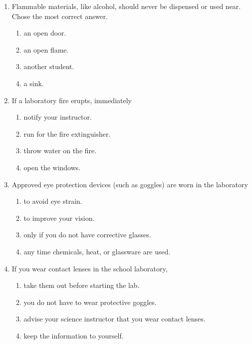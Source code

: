 \documentclass[cover.tex]{subfiles}
\begin{document}
 \begin{refsection}

\begin{multicols*}{2}
\begin{enumerate}

\item Flammable materials, like alcohol, should never be dispensed or used near. Chose the most correct answer.
\begin{enumerate}[label=(\alph*)]
\item an open door.
\item an open flame.
\item another student.
\item a sink.
\end{enumerate}

\item If a laboratory fire erupts, immediately
\begin{enumerate}[label=(\alph*)]
\item notify your instructor.
\item run for the fire extinguisher.
\item throw water on the fire.
\item open the windows.
\end{enumerate}

\item Approved eye protection devices (such as goggles) are worn in the laboratory
\begin{enumerate}[label=(\alph*)]
\item to avoid eye strain.
\item to improve your vision.
\item only if you do not have corrective glasses.
\item any time chemicals, heat, or glassware are used.
\end{enumerate}

\item If you wear contact lenses in the school laboratory,
\begin{enumerate}[label=(\alph*)]
\item take them out before starting the lab.
\item you do not have to wear protective goggles.
\item advise your science instructor that you wear contact lenses.
\item keep the information to yourself.
\end{enumerate}


\end{enumerate}
\end{multicols*}
\end{refsection}
\end{document}
